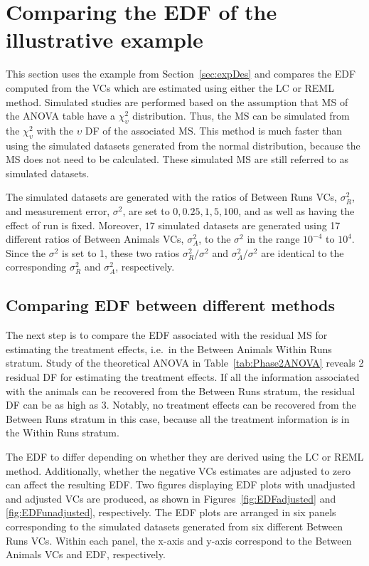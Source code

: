\documentclass[12pt,a4paper]{article}
\begin{document}
\section{Comparing the EDF of the illustrative example}
\label{sec:edfExample}
This section uses the example from Section~\ref{sec:expDes} and compares the EDF computed from the VCs which are estimated using either the LC or REML method. Simulated studies are performed based on the assumption that MS of the ANOVA table have a $\chi_{\upsilon}^2$ distribution. Thus, the MS can be simulated from the $\chi_{\upsilon}^2$ with the $\upsilon$ DF of the associated MS. This method is much faster than using the simulated datasets generated from the normal distribution, because the MS does not need to be calculated. These simulated MS are still referred to as simulated datasets. 

The simulated datasets are generated with the ratios of Between Runs VCs, $\sigma_R^2$, and measurement error, $\sigma^2$, are set to $0, 0.25, 1, 5, 100$, and as well as having the effect of run is fixed. Moreover, $17$ simulated datasets are generated using 17 different ratios of Between Animals VCs, $\sigma_A^2$, to the $\sigma^2$ in the range $10^{-4}$ to $10^4$. Since the $\sigma^2$ is set to 1, these two ratios $\sigma_R^2/\sigma^2$ and $\sigma_A^2/\sigma^2$ are identical to the corresponding $\sigma_R^2$ and $\sigma_A^2$, respectively. 

\subsection{Comparing EDF between different methods}
The next step is to compare the EDF associated with the residual MS for estimating the treatment effects, i.e.\ in the Between Animals Within Runs stratum. Study of the theoretical ANOVA in Table~\ref{tab:Phase2ANOVA} reveals 2 residual DF for estimating the treatment effects. If all the information associated with the animals can be recovered from the Between Runs stratum, the residual DF can be as high as 3. Notably, no treatment effects can be recovered from the Between Runs stratum in this case, because all the treatment information is in the Within Runs stratum. 

The EDF to differ depending on whether they are derived using the LC or REML method. Additionally, whether the negative VCs estimates are adjusted to zero can affect the resulting EDF. Two figures displaying EDF plots with unadjusted and adjusted VCs are produced, as shown in Figures~\ref{fig:EDFadjusted} and \ref{fig:EDFunadjusted}, respectively. The EDF plots are arranged in six panels corresponding to the simulated datasets generated from six different Between Runs VCs. Within each panel, the x-axis and y-axis correspond to the Between Animals VCs and EDF, respectively. 
\end{document}
